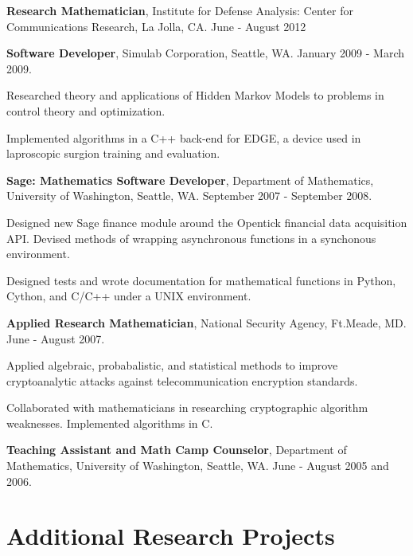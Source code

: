 \documentclass{article}
\begin{document}
\begin{itemize*}
  \setlength{\itemsep}{0pt}
  \item {\bf Research Mathematician}, Institute for Defense Analysis:
    Center for Communications Research, La Jolla, CA. June - August
    2012
  \item {\bf Software Developer}, Simulab Corporation, Seattle,
    WA. January 2009 - March 2009.
    \begin{itemize*}
    \item Researched theory and applications of Hidden Markov Models to problems
      in control theory and optimization.
    \item Implemented algorithms in a C++ back-end for EDGE, a device used in
      laproscopic surgion training and evaluation.
    \end{itemize*}
  \item {\bf Sage: Mathematics Software Developer}, Department of
    Mathematics, University of Washington, Seattle, WA. September 2007
    - September 2008.
    \begin{itemize*}
      \item Designed new Sage finance module around the Opentick
        financial data acquisition API. Devised methods of wrapping
        asynchronous functions in a synchonous environment.
      \item Designed tests and wrote documentation for mathematical
        functions in Python, Cython, and C/C++ under a UNIX environment.
    \end{itemize*}
  \item {\bf Applied Research Mathematician}, National Security Agency,
    Ft.Meade, MD. June - August 2007.
    \begin{itemize*}
      \item Applied algebraic, probabalistic, and statistical methods to
        improve cryptoanalytic attacks against telecommunication
        encryption standards.
      \item Collaborated with mathematicians in researching
        cryptographic algorithm weaknesses. Implemented algorithms in C.
    \end{itemize*}
  \item {\bf Teaching Assistant and Math Camp Counselor}, Department of
    Mathematics, University of Washington, Seattle, WA. June - August
    2005 and 2006.
\end{itemize*}

\section*{Additional Research Projects}
\end{document}
